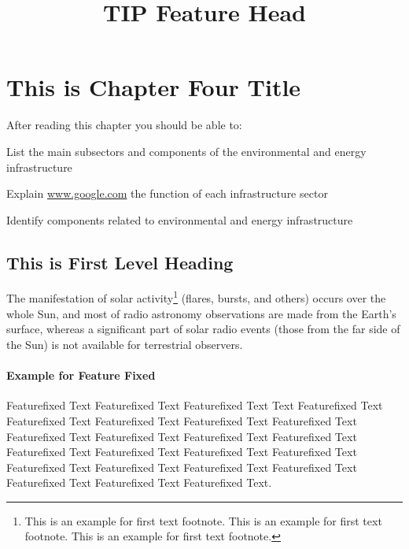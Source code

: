 \bgroup

\chapter{This is Chapter Four Title}

After reading this chapter you should be able to:

\begin{objectives}
\item List the main subsectors and components of the environmental and energy infrastructure

\item Explain \url{www.google.com} the function of each infrastructure sector

\item Identify components related to environmental and energy infrastructure
\end{objectives}

\section{This is First Level Heading}

\lipsum[1-2]

The manifestation of solar activity\footnote{This is an example for first text footnote. This is an example for first text footnote. This is an example for first text footnote.} (flares, bursts, and others) occurs over the whole Sun, and most of radio astronomy observations are made from the Earth's surface, whereas a significant part of solar radio events (those from the far side of the Sun) is not available for terrestrial observers.

\subsubsection*{Example for Feature Fixed}

\begin{featureFixed}[tip]

\title{TIP Feature Head}Featurefixed Text Featurefixed Text Featurefixed Text Text 
Featurefixed Text Featurefixed Text Featurefixed Text Featurefixed Text 
Featurefixed Text Featurefixed Text Featurefixed Text Featurefixed Text 
Featurefixed Text Featurefixed Text Featurefixed Text Featurefixed Text 
Featurefixed Text Featurefixed Text Featurefixed Text Featurefixed Text 
Featurefixed Text Featurefixed Text Featurefixed Text Featurefixed Text.

\end{featureFixed}


